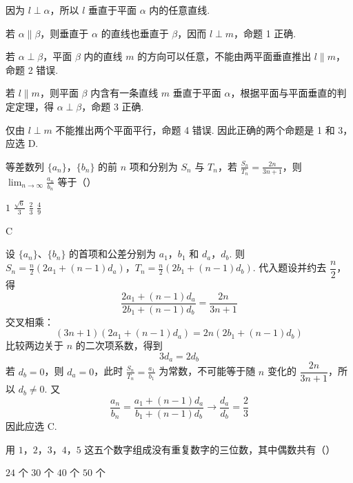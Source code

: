 \begin{solution}
因为 \(l\perp\alpha\)，所以 \(l\) 垂直于平面 \(\alpha\) 内的任意直线.

若 \(\alpha\parallel\beta\)，则垂直于 \(\alpha\) 的直线也垂直于 \(\beta\)，因而 \(l\perp m\)，命题 1 正确.

若 \(\alpha\perp\beta\)，平面 \(\beta\) 内的直线 \(m\) 的方向可以任意，不能由两平面垂直推出 \(l\parallel m\)，命题 2 错误.

若 \(l\parallel m\)，则平面 \(\beta\) 内含有一条直线 \(m\) 垂直于平面 \(\alpha\)，根据平面与平面垂直的判定定理，得 \(\alpha\perp\beta\)，命题 3 正确.

仅由 \(l\perp m\) 不能推出两个平面平行，命题 4 错误. 因此正确的两个命题是 1 和 3，应选 D.
\end{solution}

\begin{problem}
等差数列 \(\{a_{n}\}\)，\(\{b_{n}\}\) 的前 \(n\) 项和分别为 \(S_{n}\) 与 \(T_{n}\)，若 \(\frac{S_{n}}{T_{n}} = \frac{2n}{3n + 1}\)，则 \(\displaystyle\lim_{n\to \infty}\frac{a_n}{b_n}\) 等于（\quad）

\choices
    {\(1\)}
    {\(\frac{\sqrt{6}}{3} \)}
    {\(\frac{2}{3} \)}
    {\(\frac{4}{9} \)}
\end{problem}

\begin{answer}
C
\end{answer}

\begin{solution}
设 \(\{a_n\}\)、\(\{b_n\}\) 的首项和公差分别为 \(a_1\)，\(b_1\) 和 \(d_a\)，\(d_b\). 则 \(S_n=\frac n2\left(2a_1+(n-1)d_a\right)\)，\(T_n=\frac n2\left(2b_1+(n-1)d_b\right)\).
代入题设并约去 \(\dfrac n2\)，得
\[
\frac{2a_1+(n-1)d_a}{2b_1+(n-1)d_b}=\frac{2n}{3n+1}
\]
交叉相乘：
\[
(3n+1)\left(2a_1+(n-1)d_a\right)
=2n\left(2b_1+(n-1)d_b\right)
\]
比较两边关于 \(n\) 的二次项系数，得到
\[
3d_a=2d_b
\]
若 \(d_b=0\)，则 \(d_a=0\)，此时 \(\frac{S_n}{T_n}=\frac{a_1}{b_1}\) 为常数，不可能等于随 \(n\) 变化的 \(\dfrac{2n}{3n+1}\)，所以 \(d_b\ne0\). 又
\[
\frac{a_n}{b_n}
=\frac{a_1+(n-1)d_a}{b_1+(n-1)d_b}
\longrightarrow\frac{d_a}{d_b}
=\frac23
\]
因此应选 C.
\end{solution}

\begin{problem}
用 \(1\)，\(2\)，\(3\)，\(4\)，\(5\) 这五个数字组成没有重复数字的三位数，其中偶数共有（\quad）

\choices
    {\(24\) 个}
    {\(30\) 个}
    {\(40\) 个}
    {\(50\) 个}
\end{problem}

